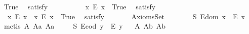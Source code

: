\begin{isabellebody}
\ True\ \isamarkupfalse%
\ {\isacharbrackleft}satisfy{\isacharbrackright}%
\isadelimproof
\ %
\endisadelimproof
%
\isatagproof
{}\isamarkupfalse%
\ \ %
%
\endisatagproof
{\isafoldproof}%
%
\isadelimproof
%
\endisadelimproof
\isanewline
\ \ \ \isamarkupfalse%
\ \ {\isachardoublequoteopen}{\isasymexists}x{\isachardot}\ \isactrlbold {\isasymnot}{\isacharparenleft}E\ x{\isacharparenright}{\isachardoublequoteclose}\ \ True\ \isamarkupfalse%
\ {\isacharbrackleft}satisfy{\isacharbrackright}%
\isadelimproof
\ %
\endisadelimproof
%
\isatagproof
{}\isamarkupfalse%
\ \ %
%
\endisatagproof
{\isafoldproof}%
%
\isadelimproof
%
\endisadelimproof
\isanewline
\ \ \ \isamarkupfalse%
\ \ {\isachardoublequoteopen}{\isacharparenleft}{\isasymexists}x{\isachardot}\ \isactrlbold {\isasymnot}{\isacharparenleft}E\ x{\isacharparenright}{\isacharparenright}\ {\isasymand}\ {\isacharparenleft}{\isasymexists}x{\isachardot}\ {\isacharparenleft}E\ x{\isacharparenright}{\isacharparenright}{\isachardoublequoteclose}\ \ True\ \isamarkupfalse%
\ {\isacharbrackleft}satisfy{\isacharbrackright}%
\isadelimproof
\ %
\endisadelimproof
%
\isatagproof
{}\isamarkupfalse%
\ \ %
%
\endisatagproof
{\isafoldproof}%
%
\isadelimproof
%
\endisadelimproof
\isanewline
{}\isamarkupfalse%
%
\isamarkuptrue%
\ \isamarkupfalse%
\ AxiomsSet{}\isanewline
\ \ \isanewline
\ \ \ \isamarkupfalse%
\ S{}{\isacharcolon}\ {\isachardoublequoteopen}E{\isacharparenleft}dom\ x{\isacharparenright}\ \isactrlbold {\isasymrightarrow}\ E\ x{\isachardoublequoteclose}%
\isadelimproof
\ %
\endisadelimproof
%
\isatagproof
{}\isamarkupfalse%
\ {\isacharparenleft}metis\ A{}\ A{}a\ A{}a{\isacharparenright}%
\endisatagproof
{\isafoldproof}%
%
\isadelimproof
%
\endisadelimproof
\isanewline
\ \ \ \isamarkupfalse%
\ S{}{\isacharcolon}\ {\isachardoublequoteopen}E{\isacharparenleft}cod\ y{\isacharparenright}\ \isactrlbold {\isasymrightarrow}\ E\ y{\isachardoublequoteclose}%
\isadelimproof
\ %
\endisadelimproof
%
\isatagproof
{}\isamarkupfalse%
\ A{}\ A{}b\ A{}b\ \isamarkupfalse%

\end{isabellebody}
